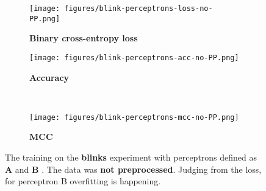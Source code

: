 \begin{figure}[h]
    \centering
    \begin{subfigure}{0.5\linewidth}
        \centering
        \captionsetup{width = 0.9\linewidth}
        \texttt{[image: figures/blink-perceptrons-loss-no-PP.png]}
        \caption{\textbf{Binary cross-entropy loss}}
        \label{fig:blink-perceptrons-loss-no-PP}
    \end{subfigure}%
    \begin{subfigure}{0.5\linewidth}
        \centering
        \captionsetup{width = 0.9\linewidth}
        \texttt{[image: figures/blink-perceptrons-acc-no-PP.png]}
        \caption{\textbf{Accuracy}}
        \label{fig:blink-perceptrons-acc-no-PP}
    \end{subfigure}%
    \\
    \begin{subfigure}{0.5\linewidth}
        \captionsetup{width = 0.9\linewidth}
        \texttt{[image: figures/blink-perceptrons-mcc-no-PP.png]}
        \caption{\textbf{MCC}}
        \label{fig:/blink-perceptrons-mcc-no-PP}
    \end{subfigure}%
    \begin{minipage}{0.5\linewidth}
        \caption{The training on the \textbf{blinks} experiment with perceptrons defined as \textbf{A} and \textbf{B} . The data was \textbf{not preprocessed}. Judging from the loss, for perceptron B overfitting is happening.}
        \label{fig:blink-perceptrons-no-PP}
    \end{minipage}
\end{figure}